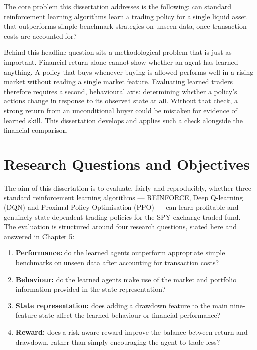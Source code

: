 The core problem this dissertation addresses is the following: can standard
reinforcement learning algorithms learn a trading policy for a single
liquid asset that outperforms simple benchmark strategies on unseen data,
once transaction costs are accounted for?

Behind this headline question sits a methodological problem that is just as
important. Financial return alone cannot show whether an agent has learned
anything. A policy that buys whenever buying is allowed performs well in a
rising market without reading a single market feature. Evaluating learned
traders therefore requires a second, behavioural axis: determining whether
a policy's actions change in response to its observed state at all. Without
that check, a strong return from an unconditional buyer could be mistaken
for evidence of learned skill. This dissertation develops and applies such
a check alongside the financial comparison.

\section{Research Questions and Objectives}

The aim of this dissertation is to evaluate, fairly and reproducibly,
whether three standard reinforcement learning algorithms --- REINFORCE,
Deep Q-learning (DQN) and Proximal Policy Optimisation (PPO) --- can learn
profitable and genuinely state-dependent trading policies for the SPY
exchange-traded fund. The evaluation is structured around four research
questions, stated here and answered in Chapter 5:

\begin{enumerate}
\def\labelenumi{\arabic{enumi}.}
\item
  \textbf{Performance:} do the learned agents outperform appropriate
  simple benchmarks on unseen data after accounting for transaction
  costs?
\item
  \textbf{Behaviour:} do the learned agents make use of the market and
  portfolio information provided in the state representation?
\item
  \textbf{State representation:} does adding a drawdown feature to the
  main nine-feature state affect the learned behaviour or financial
  performance?
\item
  \textbf{Reward:} does a risk-aware reward improve the balance between
  return and drawdown, rather than simply encouraging the agent to trade
  less?
\end{enumerate}

